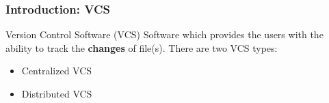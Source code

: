 \begin{frame}

\frametitle{Introduction: VCS}

\begin{block}{Version Control Software (VCS)}
Software which provides the users with the ability to track the \textbf{changes} of file(s). There are two VCS types:
\begin{itemize}
\item Centralized VCS
\item Distributed VCS
\end{itemize}
\end{block}

\end{frame}